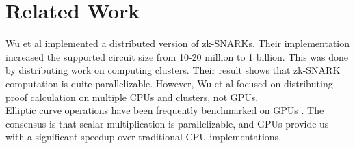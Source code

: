\section{Related Work}

Wu et al \cite{wu2018dizk} implemented a distributed version of zk-SNARKs. Their implementation increased the supported circuit size from 10-20 million to 1 billion. This was done by distributing work on computing clusters. Their result shows that zk-SNARK computation is quite parallelizable. However, Wu et al focused on distributing proof calculation on multiple CPUs and clusters, not GPUs.
\\
Elliptic curve operations have been frequently benchmarked on GPUs \cite{mahefast, bernstein2010ecc2k, antao2010elliptic}. The consensus is that scalar multiplication is parallelizable, and GPUs provide us with a significant speedup over traditional CPU implementations.